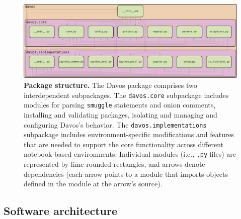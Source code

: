 \documentclass[preprint,12pt,a4paper]{elsarticle}
\begin{document}
\begin{figure}[tp]
\centering
\includegraphics[width=\textwidth]{figs/package_structure}
\caption{\small \textbf{Package structure.} The Davos package
  comprises two interdependent subpackages.  The \texttt{davos.core}
  subpackage includes modules for parsing \texttt{smuggle} statements
  and onion comments, installing and validating packages, isolating and managing and
  configuring Davos's behavior.  The
  \texttt{davos.implementations} subpackage includes
  environment-specific modifications and features that are needed to
  support the core functionality across different notebook-based
  environments.  Individual modules (i.e., \texttt{.py} files) are represented by lime
  rounded rectangles, and arrows denote dependencies (each arrow
  points to a module that imports objects defined in the module at the
  arrow's source).}
\label{fig:package-structure}
\end{figure}


\subsection{Software architecture}
\end{document}
